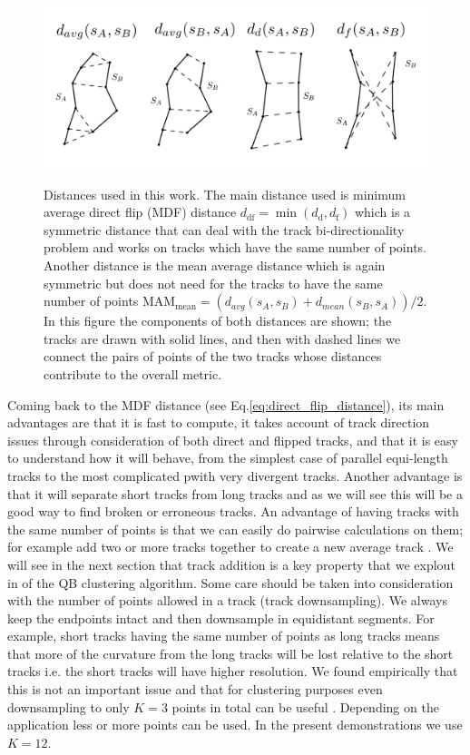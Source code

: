 \documentclass[preprint,authoryear,a4paper,10pt,onecolumn]{elsarticle}
\begin{document}
\begin{figure}

\includegraphics[scale=0.6]{distances}

\centering{}\label{Flo:Distances_used}\caption{Distances used in this work. The main distance used is minimum average
direct flip (MDF) distance $d_{\textrm{df}}=\min(d_{\textrm{d}},d_{\textrm{f}})$
which is a symmetric distance that can deal with the track bi-directionality
problem and works on tracks which have the same number of points.
Another distance is the mean average distance which is again symmetric
but does not need for the tracks to have the same number of points
$\textrm{MAM}_{\textrm{mean}}=(d_{avg}(s_{A},s_{B})+d_{mean}(s_{B},s_{A}))/2$.
In this figure the components of both distances are shown; the tracks are drawn with solid
lines, and then with dashed lines we connect the
pairs of points of the two tracks whose distances contribute to the
overall metric.}

\end{figure}

Coming back to the MDF distance (see Eq.\ref{eq:direct_flip_distance}),
its main advantages are that it is fast to compute, it takes account of
track direction issues through consideration of both direct and flipped
tracks, and that it is easy to understand how it will behave, from the
simplest case of parallel equi-length tracks to the most complicated
pwith very divergent tracks. Another advantage is that it will separate
short tracks from long tracks and as we will see this will be a good way
to find broken or erroneous tracks. An advantage of having tracks with
the same number of points is that we can easily do pairwise calculations
on them; for example add two or more tracks together to create a new
average track . We will see in the next section that track addition is a
key property that we explout in of the QB clustering algorithm.  Some
care should be taken into consideration with the number of points
allowed in a track (track downsampling). We always keep the endpoints
intact and then downsample in equidistant segments. For example, short
tracks having the same number of points as long tracks means that more
of the curvature from the long tracks will be lost relative to the short
tracks i.e. the short tracks will have higher resolution.  We found
empirically that this is not an important issue and that for clustering
purposes even downsampling to only $K=3$ points in total can be useful
\cite{EGMB10}. Depending on the application less or more points can be
used. In the present demonstrations we use $K=12$.
\end{document}
